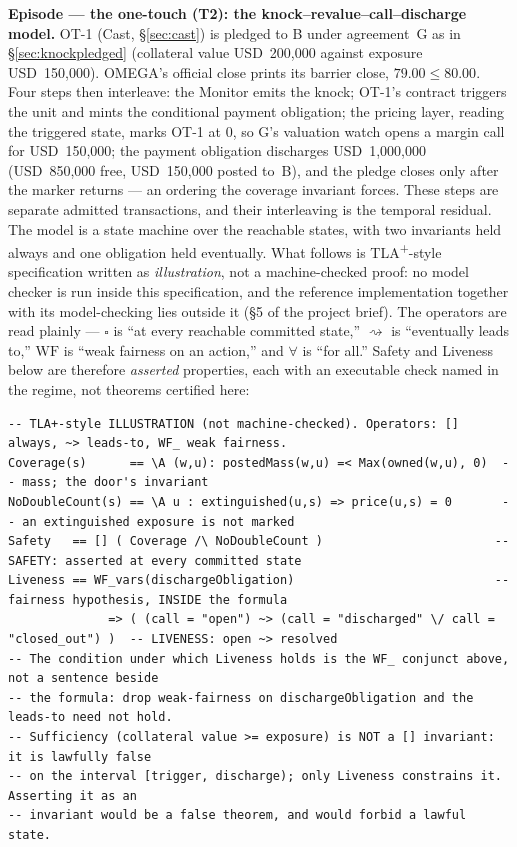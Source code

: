 \documentclass[11pt,a4paper]{article}
\newcommand{\USD}[1]{\mbox{USD~#1}}
\begin{document}
\medskip\noindent\textbf{Episode --- the one-touch (T2): the knock--revalue--call--discharge
model.}
OT-1 (Cast, \S\ref{sec:cast}) is pledged to B under agreement~G as in
\S\ref{sec:knockpledged} (collateral value \USD{200{,}000} against exposure
\USD{150{,}000}). OMEGA's official close prints its barrier close, $79.00 \le 80.00$. Four steps
then interleave: the Monitor emits the knock; OT-1's contract triggers the unit and mints the
conditional payment obligation; the pricing layer, reading the triggered state, marks OT-1 at
$0$, so G's valuation watch opens a margin call for \USD{150{,}000}; the payment obligation
discharges \USD{1{,}000{,}000} (\USD{850{,}000} free, \USD{150{,}000} posted to~B), and the
pledge closes only after the marker returns --- an ordering the coverage invariant forces.
These steps are separate admitted transactions, and their interleaving is the temporal
residual. The model is a state machine over the reachable states, with two invariants held
always and one obligation held eventually. What follows is TLA\textsuperscript{+}-style
specification written as \emph{illustration}, not a machine-checked proof: no model checker is
run inside this specification, and the reference implementation together with its
model-checking lies outside it (\S 5 of the project brief). The operators are read plainly ---
$\square$ is ``at every reachable committed state,'' $\rightsquigarrow$ is ``eventually leads
to,'' $\textrm{WF}$ is ``weak fairness on an action,'' and $\forall$ is ``for all.'' Safety and
Liveness below are therefore \emph{asserted} properties, each with an executable check named in
the regime, not theorems certified here:

\begin{lstlisting}
-- TLA+-style ILLUSTRATION (not machine-checked). Operators: [] always, ~> leads-to, WF_ weak fairness.
Coverage(s)      == \A (w,u): postedMass(w,u) =< Max(owned(w,u), 0)  -- mass; the door's invariant
NoDoubleCount(s) == \A u : extinguished(u,s) => price(u,s) = 0       -- an extinguished exposure is not marked
Safety   == [] ( Coverage /\ NoDoubleCount )                        -- SAFETY: asserted at every committed state
Liveness == WF_vars(dischargeObligation)                            -- fairness hypothesis, INSIDE the formula
              => ( (call = "open") ~> (call = "discharged" \/ call = "closed_out") )  -- LIVENESS: open ~> resolved
-- The condition under which Liveness holds is the WF_ conjunct above, not a sentence beside
-- the formula: drop weak-fairness on dischargeObligation and the leads-to need not hold.
-- Sufficiency (collateral value >= exposure) is NOT a [] invariant: it is lawfully false
-- on the interval [trigger, discharge); only Liveness constrains it. Asserting it as an
-- invariant would be a false theorem, and would forbid a lawful state.
\end{lstlisting}
\end{document}
